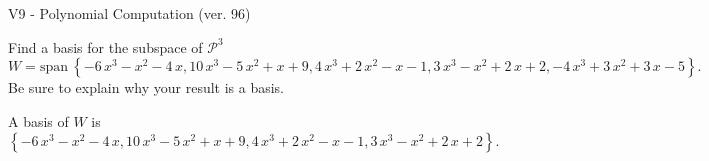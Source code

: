 \begin{exercise}
  \begin{exerciseTitle}V9 - Polynomial Computation (ver. 96)\end{exerciseTitle}
  \begin{exerciseStatement}
    Find a basis for the subspace of \(\mathcal{P}^3\) 
\[W=\mathrm{span}\ \left\{-6 \, x^{3} - x^{2} - 4 \, x , 10 \, x^{3} - 5 \, x^{2} + x + 9 , 4 \, x^{3} + 2 \, x^{2} - x - 1 , 3 \, x^{3} - x^{2} + 2 \, x + 2 , -4 \, x^{3} + 3 \, x^{2} + 3 \, x - 5\right\}.\]
 Be sure to explain why your result is a basis.


  \end{exerciseStatement}
  \begin{exerciseAnswer}
   A basis of \(W\) is  \(\left\{-6 \, x^{3} - x^{2} - 4 \, x , 10 \, x^{3} - 5 \, x^{2} + x + 9 , 4 \, x^{3} + 2 \, x^{2} - x - 1 , 3 \, x^{3} - x^{2} + 2 \, x + 2\right\}\).
  


  \end{exerciseAnswer}
\end{exercise}